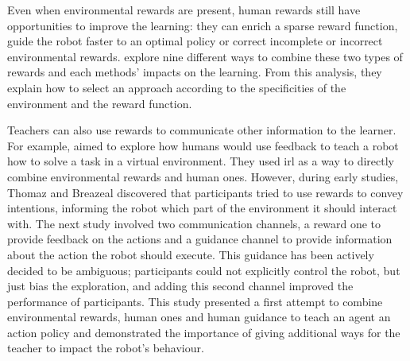 Even when environmental rewards are present, human rewards still have opportunities to improve the learning: they can enrich a sparse reward function, guide the robot faster to an optimal policy or correct incomplete or incorrect environmental rewards. \cite{knox2010combining} explore nine different ways to combine these two types of rewards and each methods' impacts on the learning. From this analysis, they explain how to select an approach according to the specificities of the environment and the reward function.



Teachers can also use rewards to communicate other information to the learner. For example, \cite{thomaz2008teachable} aimed to explore how humans would use feedback to teach a robot how to solve a task in a virtual environment. They used \acrfull{irl} as a way to directly combine environmental rewards and human ones. However, during early studies, Thomaz and Breazeal discovered that participants tried to use rewards to convey intentions, informing the robot which part of the environment it should interact with. The next study involved two communication channels, a reward one to provide feedback on the actions and a guidance channel to provide information about the action the robot should execute. This guidance has been actively decided to be ambiguous; participants could not explicitly control the robot, but just bias the exploration, and adding this second channel improved the performance of participants. This study presented a first attempt to combine environmental rewards, human ones and human guidance to teach an agent an action policy and demonstrated the importance of giving additional ways for the teacher to impact the robot's behaviour.


